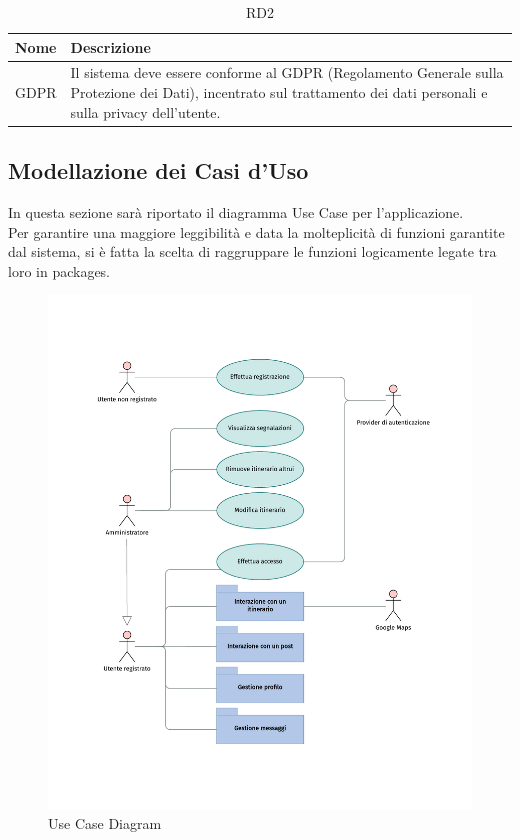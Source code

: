 \documentclass{natourDoc}
\begin{document}
\begin{table}[H]
	\centering
	\begin{tabular}{ |p{5cm}|p{10.3cm}| }
		\hline
		\rowcolor{PineGreen!70}
		\textbf{Nome} & \textbf{Descrizione}                                                                      \\
		\hline
		GDPR          & Il sistema deve essere conforme al GDPR (Regolamento Generale sulla Protezione dei Dati),
		incentrato sul trattamento dei dati personali e sulla privacy dell’utente.                                \\
		\hline
	\end{tabular}
	\caption{RD2}
	\label{table:27}
\end{table}

\newpage

\newpage
\subsection{Modellazione dei Casi d'Uso}
In questa sezione sarà riportato il diagramma Use Case per l'applicazione.\\
Per garantire una maggiore leggibilità e data la molteplicità di funzioni garantite
dal sistema, si è fatta la scelta di raggruppare le funzioni logicamente legate
tra loro in packages.

\begin{figure}[!htbp]
	\centering
	\includegraphics[width=\textwidth, page=1]{./diagrams/useCase.pdf}
	\caption{Use Case Diagram}
\end{figure}
\FloatBarrier
\end{document}
